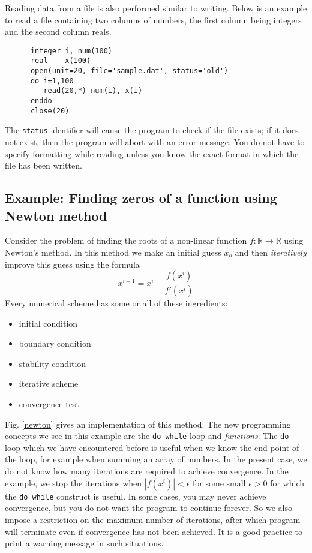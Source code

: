 \documentclass[11pt,oneside]{amsart}
\newcommand{\re}{\mathbb{R}}
\begin{document}
Reading data from a file is also performed similar to writing. Below is an example to read a file containing two columns of numbers, the first column being integers and the second column reals.
\begin{verbatim}
      integer i, num(100)
      real    x(100)
      open(unit=20, file='sample.dat', status='old')
      do i=1,100
         read(20,*) num(i), x(i)
      enddo
      close(20)
\end{verbatim}
The {\tt status} identifier will cause the program to check if the file exists; if it does not exist, then the program will abort with an error message. You do not have to specify formatting while reading unless you know the exact format in which the file has been written.

\subsection{Example: Finding zeros of a function using Newton method}

Consider the problem of finding the roots of a non-linear function $f: \re \to \re$ using Newton's method. In this method we make an initial guess $x_o$ and then {\em iteratively} improve this guess using the formula
\begin{equation}
x^{i+1} = x^i - \frac{ f(x^i) }{ f'(x^i) }
\end{equation}
Every numerical scheme has some or all of these ingredients:
\begin{itemize}
\item initial condition
\item boundary condition
\item stability condition
\item iterative scheme
\item convergence test
\end{itemize}
Fig. \ref{newton} gives an implementation of this method. The new programming concepts we see in this example are the {\tt do while} loop and {\em functions}.  The {\tt do} loop which we have encountered before is useful when we know the end point of the loop, for example when summing an array of numbers. In the present case, we do not know how many iterations are required to achieve convergence. In the example, we stop the iterations when $| f(x^i)| < \epsilon$ for some small $\epsilon > 0$ for which the {\tt do while} construct is useful. In some cases, you may never achieve convergence, but you do not want the program to continue forever. So we also impose a restriction on the maximum number of iterations, after which program will terminate even if convergence has not been achieved. It is a good practice to print a warning message in such situations.
\end{document}
